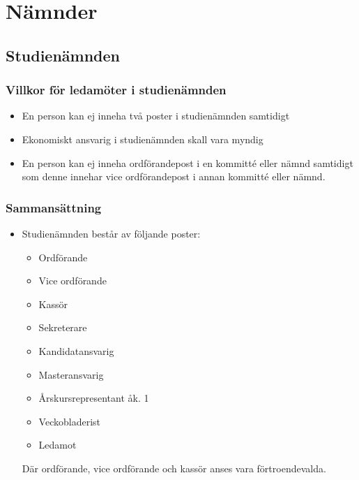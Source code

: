 \documentclass[11pt,a4paper]{article}
\begin{document}
\section{Nämnder}

\subsection{Studienämnden}

\subsubsection{Villkor för ledamöter i studienämnden}
\begin{itemize}
\item En person kan ej inneha två poster i studienämnden samtidigt
\item Ekonomiskt ansvarig i studienämnden skall vara myndig
\item En person kan ej inneha ordförandepost i en kommitté eller nämnd samtidigt som denne innehar vice ordförandepost i annan kommitté eller nämnd.
\end{itemize}

\subsubsection{Sammansättning}

\begin{itemize}

  \item Studienämnden består av följande poster:
    \begin{itemize}

      \item Ordförande
      \item Vice ordförande
      \item Kassör
      \item Sekreterare
      \item Kandidatansvarig
      \item Masteransvarig
      \item Årskursrepresentant åk. 1
      \item Veckobladerist
      \item Ledamot

    \end{itemize}
Där ordförande, vice ordförande och kassör anses vara förtroendevalda.

\end{itemize}
\end{document}
